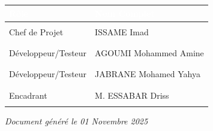 \documentclass[12pt,a4paper]{report}
\begin{document}
\vspace{1cm}

\begin{tabularx}{\textwidth}{|X|X|}
    \hline
    \rowcolor{emsiblue}\textcolor{white}{\textbf{Rôle}} & \textcolor{white}{\textbf{Nom Complet}} \\
    \hline
    & & \\
    Chef de Projet & ISSAME Imad \\
    & & \\
    \hline
    & & \\
    Développeur/Testeur & AGOUMI Mohammed Amine \\
    & & \\
    \hline
    & & \\
    Développeur/Testeur & JABRANE Mohamed Yahya \\
    & & \\
    \hline
    & & \\
    Encadrant & M. ESSABAR Driss \\
    & & \\
    \hline
\end{tabularx}

\vspace{2cm}

\begin{center}
\textit{Document généré le 01 Novembre 2025}
\end{center}
\end{document}
